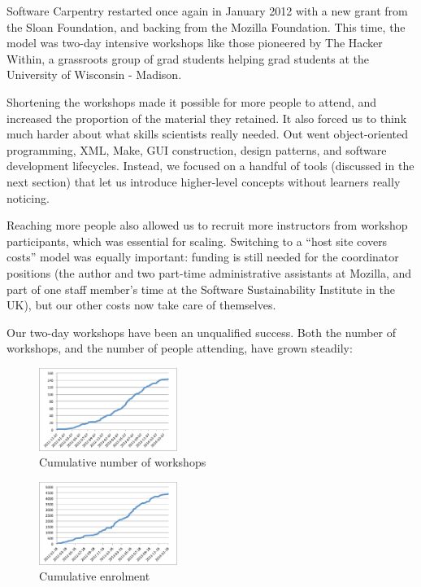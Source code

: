 \documentclass[10pt,a4paper,twocolumn]{article}
\begin{document}
Software Carpentry restarted once again in January 2012 with a new
grant from the Sloan Foundation, and backing from the Mozilla
Foundation. This time, the model was two-day intensive workshops like
those pioneered by The Hacker Within, a grassroots group of grad
students helping grad students at the University of Wisconsin -
Madison.

Shortening the workshops made it possible for more people to attend,
and increased the proportion of the material they retained. It also
forced us to think much harder about what skills scientists really
needed. Out went object-oriented programming, XML, Make, GUI
construction, design patterns, and software development
lifecycles. Instead, we focused on a handful of tools (discussed in
the next section) that let us introduce higher-level concepts without
learners really noticing.

Reaching more people also allowed us to recruit more instructors from
workshop participants, which was essential for scaling. Switching to a
``host site covers costs'' model was equally important: funding is
still needed for the coordinator positions (the author and two
part-time administrative assistants at Mozilla, and part of one staff
member's time at the Software Sustainability Institute in the UK), but
our other costs now take care of themselves.

Our two-day workshops have been an unqualified success. Both the number
of workshops, and the number of people attending, have grown steadily:

\begin{figure}
\centering
\includegraphics[width=0.4\textwidth]{workshops.pdf}
\caption{\label{f:workshops}Cumulative number of workshops}
\end{figure}

\begin{figure}
\centering
\includegraphics[width=0.4\textwidth]{enrolment.pdf}
\caption{\label{f:enrolment}Cumulative enrolment}
\end{figure}
\end{document}
